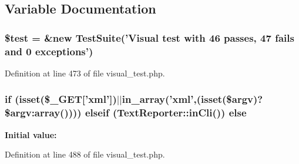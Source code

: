 \subsection{Variable Documentation}
\hypertarget{visual__test_8php_a31daebf88fc668f410293e2c70cea3fc}{
\subsubsection[{\$test}]{\setlength{\rightskip}{0pt plus 5cm}\$test = \&new {\bf Test\-Suite}('Visual test with 46 passes, 47 fails and 0 exceptions')}}\label{visual__test_8php_a31daebf88fc668f410293e2c70cea3fc}


Definition at line 473 of file visual\-\_\-test.\-php.

\hypertarget{visual__test_8php_aff26b541baa075ca5514c263db65b944}{
\subsubsection[{else}]{\setlength{\rightskip}{0pt plus 5cm}if (isset(\$\-\_\-\-G\-E\-T\mbox{[}'xml'\mbox{]})$|$$|$in\-\_\-array('xml',(isset(\$argv)?\$argv\-:array()))) {\bf elseif} ({\bf Text\-Reporter\-::in\-Cli}()) else}}\label{visual__test_8php_aff26b541baa075ca5514c263db65b944}
{\bfseries Initial value\-:}


Definition at line 488 of file visual\-\_\-test.\-php.

